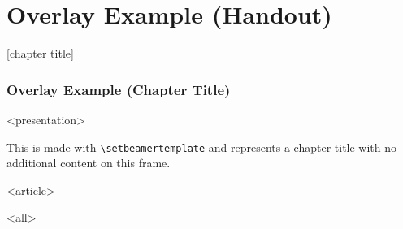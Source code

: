 \section{Overlay Example (Handout)}
{%
[chapter title]
\begin{frame}[fragile]

\frametitle<presentation>{Overlay Example (Chapter Title)}




\mode
<presentation>

This is made with \texttt{\textbackslash{}setbeamertemplate}
and represents a chapter title with no additional content on this frame.


\mode
<article>


\mode
<all>

\end{frame}
}

\newpage

